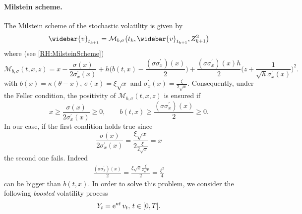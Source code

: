 \paragraph{Milstein scheme.}
The Milstein scheme of the stochastic volatility is given by
\begin{equation*}
	\widebar{v}_{t_{k+1}} = \mathcal{M}_{b,\sigma} \big( t_k, \widebar{v}_{t_{k+1}}, Z_{k+1}^2 \big)
\end{equation*}
where (see \eqref{RH:MilsteinScheme})
\begin{equation*}
	\mathcal{M}_{b,\sigma} (t,x,z) = x - \frac{\sigma(x)}{2 \sigma_{x}^{\prime} (x)} + h \bigg(b(t, x) - \frac{ (\sigma \sigma_{x}^{\prime}) (x)}{2}\bigg) + \frac{ (\sigma \sigma_{x}^{\prime}) (x) h}{2} \bigg( z + \frac{1}{\sqrt{h} \sigma_{x}^{\prime} (x)} \bigg)^2.
\end{equation*}
with $b(x) = \kappa (\theta - x)$, $\sigma(x) = \xi \sqrt{x}$ and $ \sigma_{x}^{\prime} (x) = \frac{\xi}{2 \sqrt{x}}$. Consequently, under the Feller condition, the positivity of $\mathcal{M}_{b,\sigma} (t,x,z) $ is ensured if
\begin{equation*}
	x \geq \frac{\sigma(x)}{2 \sigma_{x}^{\prime} (x) } \geq 0, \qquad b(t, x) \geq \frac{ (\sigma \sigma_{x}^{\prime}) (x)}{2} \geq 0.
\end{equation*}
In our case, if the first condition holds true since
\begin{equation*}
	\frac{\sigma(x)}{2 \sigma_{x}^{\prime} (x) } = \frac{ \xi \sqrt{x} }{2 \frac{\xi}{2 \sqrt{x}} } = x
\end{equation*}
the second one fails. Indeed
\begin{equation*}
	\begin{aligned}
		\frac{ (\sigma \sigma_{x}^{\prime}) (x)}{2} = \frac{ \xi \sqrt{x} \frac{\xi}{2 \sqrt{x}} }{2} = \frac{ \xi^2 }{4}
	\end{aligned}
\end{equation*}
can be bigger than $b(t, x)$. In order to solve this problem, we consider the following \textit{boosted} volatility process
\begin{equation}
	Y_t = \operatorname{e}^{\kappa t} v_t, \, t \in [0,T].
\end{equation}


